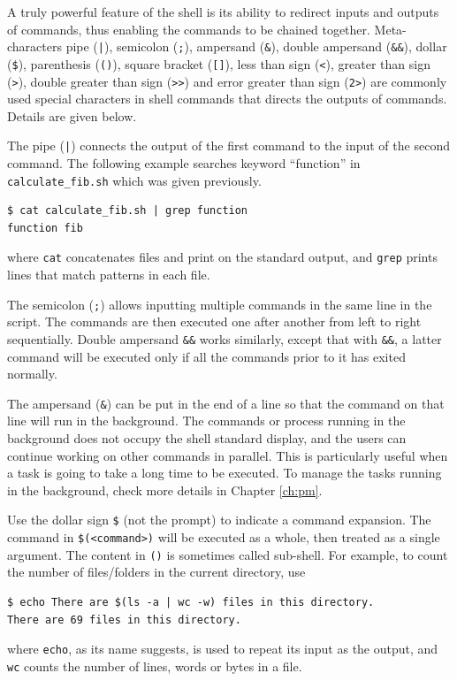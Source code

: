 A truly powerful feature of the shell is its ability to redirect inputs and outputs of commands, thus enabling the commands to be chained together. Meta-characters pipe (\verb?|?), semicolon (\verb|;|), ampersand (\verb|&|), double ampersand (\verb|&&|), dollar (\verb|$|), parenthesis (\verb|()|), square bracket (\verb|[]|), less than sign (\verb|<|), greater than sign (\verb|>|), double greater than sign (\verb|>>|) and error greater than sign (\verb|2>|) are commonly used special characters in shell commands that directs the outputs of commands. Details are given below.

The pipe (\verb$|$) connects the output of the first command to the input of the second command. The following example searches keyword ``function'' in \verb|calculate_fib.sh| which was given previously.
\begin{lstlisting}
$ cat calculate_fib.sh | grep function
function fib
\end{lstlisting}
where \verb|cat| concatenates files and print on the standard output, and \verb|grep| prints lines that match patterns in each file.

The semicolon (\verb|;|) allows inputting multiple commands in the same line in the script. The commands are then executed one after another from left to right sequentially. Double ampersand \verb|&&| works similarly, except that with \verb|&&|, a latter command will be executed only if all the commands prior to it has exited normally.

The ampersand (\verb|&|) can be put in the end of a line so that the command on that line will run in the background. The commands or process running in the background does not occupy the shell standard display, and the users can continue working on other commands in parallel. This is particularly useful when a task is going to take a long time to be executed. To manage the tasks running in the background, check more details in Chapter \ref{ch:pm}.

Use the dollar sign \verb|$| (not the prompt) to indicate a command expansion. The command in \verb|$(<command>)| will be executed as a whole, then treated as a single argument. The content in \verb|()| is sometimes called sub-shell. For example, to count the number of files/folders in the current directory, use
\begin{lstlisting}
$ echo There are $(ls -a | wc -w) files in this directory.
There are 69 files in this directory.
\end{lstlisting}
where \verb|echo|, as its name suggests, is used to repeat its input as the output, and \verb|wc| counts the number of lines, words or bytes in a file.

